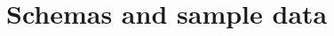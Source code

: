 



 \label{sec:milestone1}

  

  \section{Schemas and sample data}\label{sub:schemas} %
  
  
  

  

 \label{sec:milestone2}

  



